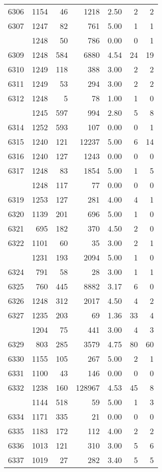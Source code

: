 \documentclass[
]{article}
\begin{document}
\begin{table}
\begin{tabular}[t]{lrrrrrr}
6306 & 1154 & 46 & 1218 & 2.50 & 2 & 2\\
6307 & 1247 & 82 & 761 & 5.00 & 1 & 1\\
\addlinespace
6308 & 1248 & 50 & 786 & 0.00 & 0 & 1\\
6309 & 1248 & 584 & 6880 & 4.54 & 24 & 19\\
6310 & 1249 & 118 & 388 & 3.00 & 2 & 2\\
6311 & 1249 & 53 & 294 & 3.00 & 2 & 2\\
6312 & 1248 & 5 & 78 & 1.00 & 1 & 0\\
\addlinespace
6313 & 1245 & 597 & 994 & 2.80 & 5 & 8\\
6314 & 1252 & 593 & 107 & 0.00 & 0 & 1\\
6315 & 1240 & 121 & 12237 & 5.00 & 6 & 14\\
6316 & 1240 & 127 & 1243 & 0.00 & 0 & 0\\
6317 & 1248 & 83 & 1854 & 5.00 & 1 & 5\\
\addlinespace
6318 & 1248 & 117 & 77 & 0.00 & 0 & 0\\
6319 & 1253 & 127 & 281 & 4.00 & 4 & 1\\
6320 & 1139 & 201 & 696 & 5.00 & 1 & 0\\
6321 & 695 & 182 & 370 & 4.50 & 2 & 0\\
6322 & 1101 & 60 & 35 & 3.00 & 2 & 1\\
\addlinespace
6323 & 1231 & 193 & 2094 & 5.00 & 1 & 0\\
6324 & 791 & 58 & 28 & 3.00 & 1 & 1\\
6325 & 760 & 445 & 8882 & 3.17 & 6 & 0\\
6326 & 1248 & 312 & 2017 & 4.50 & 4 & 2\\
6327 & 1235 & 203 & 69 & 1.36 & 33 & 4\\
\addlinespace
6328 & 1204 & 75 & 441 & 3.00 & 4 & 3\\
6329 & 803 & 285 & 3579 & 4.75 & 80 & 60\\
6330 & 1155 & 105 & 267 & 5.00 & 2 & 1\\
6331 & 1100 & 43 & 146 & 0.00 & 0 & 0\\
6332 & 1238 & 160 & 128967 & 4.53 & 45 & 8\\
\addlinespace
6333 & 1144 & 518 & 59 & 5.00 & 1 & 3\\
6334 & 1171 & 335 & 21 & 0.00 & 0 & 0\\
6335 & 1183 & 172 & 112 & 4.00 & 2 & 2\\
6336 & 1013 & 121 & 310 & 3.00 & 5 & 6\\
6337 & 1019 & 27 & 282 & 3.40 & 5 & 5\\

\end{tabular}
\end{table}
\end{document}
